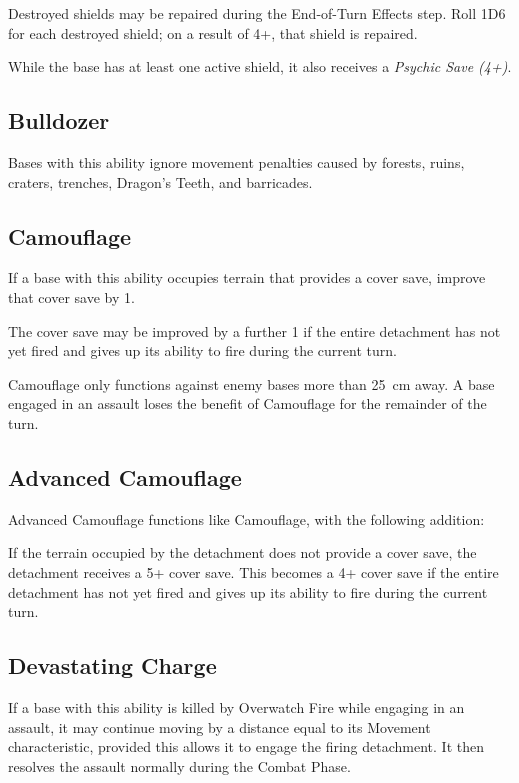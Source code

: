 Destroyed shields may be repaired during the End-of-Turn Effects step. Roll 1D6 for each destroyed shield; on a result of 4+, that shield is repaired.

While the base has at least one active shield, it also receives a \textit{Psychic Save (4+)}.

\subsection{Bulldozer}

Bases with this ability ignore movement penalties caused by forests, ruins, craters, trenches, Dragon's Teeth, and barricades.

\subsection{Camouflage}

If a base with this ability occupies terrain that provides a cover save, improve that cover save by 1.

The cover save may be improved by a further 1 if the entire detachment has not yet fired and gives up its ability to fire during the current turn.

Camouflage only functions against enemy bases more than 25~cm away. A base engaged in an assault loses the benefit of Camouflage for the remainder of the turn.

\subsection{Advanced Camouflage}

Advanced Camouflage functions like Camouflage, with the following addition:

If the terrain occupied by the detachment does not provide a cover save, the detachment receives a 5+ cover save. This becomes a 4+ cover save if the entire detachment has not yet fired and gives up its ability to fire during the current turn.

\subsection{Devastating Charge}

If a base with this ability is killed by Overwatch Fire while engaging in an assault, it may continue moving by a distance equal to its Movement characteristic, provided this allows it to engage the firing detachment. It then resolves the assault normally during the Combat Phase.

